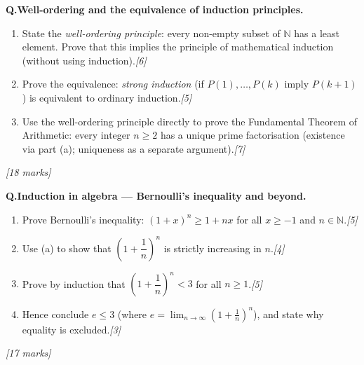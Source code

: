 \documentclass[12pt,a4paper]{article}
\theoremstyle{defstyle}
\newcounter{qnum}
\newcommand{\Q}[1]{\stepcounter{qnum}\medskip\noindent\textbf{Q\theqnum.}\quad #1\par}
\newcommand{\mks}[1]{\hfill\textit{[#1 marks]}}
\begin{document}
\begin{tcolorbox}[explore, title={\color{explorecol}\bfseries Exploration (Beyond Syllabus)}]

\Q{\textbf{Well-ordering and the equivalence of induction principles.}
\begin{enumerate}[label=(\alph*),itemsep=4pt]
  \item State the \emph{well-ordering principle}: every non-empty subset of $\mathbb{N}$ has a least element.
        Prove that this implies the principle of mathematical induction (without using induction).\hfill\textit{[6]}
  \item Prove the equivalence: \emph{strong induction} (if $P(1),\ldots,P(k)$ imply $P(k+1)$) is equivalent to ordinary induction.\hfill\textit{[5]}
  \item Use the well-ordering principle directly to prove the Fundamental Theorem of Arithmetic: every integer $n\geq2$ has a unique prime factorisation (existence via part (a); uniqueness as a separate argument).\hfill\textit{[7]}
\end{enumerate}\mks{18}}

\Q{\textbf{Induction in algebra --- Bernoulli's inequality and beyond.}
\begin{enumerate}[label=(\alph*),itemsep=4pt]
  \item Prove Bernoulli's inequality: $(1+x)^n\geq1+nx$ for all $x\geq-1$ and $n\in\mathbb{N}$.\hfill\textit{[5]}
  \item Use (a) to show that $\left(1+\dfrac{1}{n}\right)^n$ is strictly increasing in $n$.\hfill\textit{[4]}
  \item Prove by induction that $\left(1+\dfrac{1}{n}\right)^n<3$ for all $n\geq1$.\hfill\textit{[5]}
  \item Hence conclude $e\leq3$ (where $e=\lim_{n\to\infty}\left(1+\tfrac{1}{n}\right)^n$), and state why equality is excluded.\hfill\textit{[3]}
\end{enumerate}\mks{17}}

\end{tcolorbox}
\end{document}
